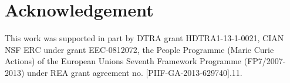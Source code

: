 \documentclass[10pt,journal]{IEEEtran}
\begin{document}
\section*{Acknowledgement}
This work was supported in part by DTRA grant HDTRA1-13-1-0021, CIAN NSF ERC under grant EEC-0812072, the People Programme (Marie Curie Actions) of the European Unions Seventh Framework Programme (FP7/2007-2013) under REA grant agreement no. [PIIF-GA-2013-629740].11.



\end{document}
